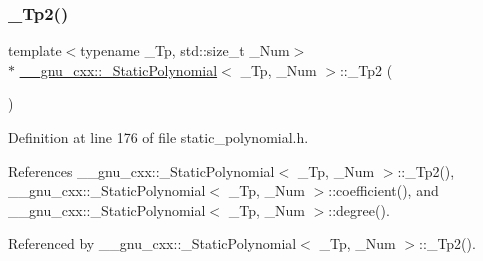 \subsubsection{\texorpdfstring{\+\_\+\+Tp2()}{\_Tp2()}}
{\footnotesize\ttfamily template$<$typename \+\_\+\+Tp, std\+::size\+\_\+t \+\_\+\+Num$>$ \\
$\ast$ \hyperlink{class____gnu__cxx_1_1__StaticPolynomial}{\+\_\+\+\_\+gnu\+\_\+cxx\+::\+\_\+\+Static\+Polynomial}$<$ \+\_\+\+Tp, \+\_\+\+Num $>$\+::\+\_\+\+Tp2 (\begin{DoxyParamCaption}{ }\end{DoxyParamCaption})\hspace{0.3cm}{\ttfamily [inline]}}



Definition at line 176 of file static\+\_\+polynomial.\+h.



References \+\_\+\+\_\+gnu\+\_\+cxx\+::\+\_\+\+Static\+Polynomial$<$ \+\_\+\+Tp, \+\_\+\+Num $>$\+::\+\_\+\+Tp2(), \+\_\+\+\_\+gnu\+\_\+cxx\+::\+\_\+\+Static\+Polynomial$<$ \+\_\+\+Tp, \+\_\+\+Num $>$\+::coefficient(), and \+\_\+\+\_\+gnu\+\_\+cxx\+::\+\_\+\+Static\+Polynomial$<$ \+\_\+\+Tp, \+\_\+\+Num $>$\+::degree().



Referenced by \+\_\+\+\_\+gnu\+\_\+cxx\+::\+\_\+\+Static\+Polynomial$<$ \+\_\+\+Tp, \+\_\+\+Num $>$\+::\+\_\+\+Tp2().


